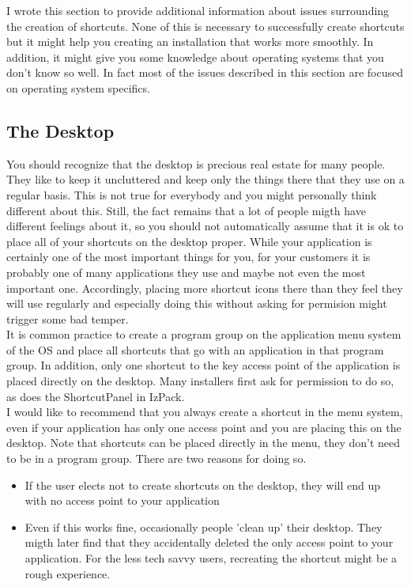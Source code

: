 I wrote this section to provide additional information about
issues surrounding the creation of shortcuts. None of this is necessary
to successfully create shortcuts but it might help you creating an
installation that works more smoothly. In addition, it might give you
some knowledge about operating systems that you don't know so well. In
fact most of the issues described in this section are focused on
operating system specifics.\\

\subsection{The Desktop}

You should recognize that the desktop is precious real estate for many
people. They like to keep it uncluttered and keep only the things there
that they use on a regular basis. This is not true for everybody and you
might personally think different about this. Still, the fact remains
that a lot of people migth have different feelings about it, so you
should not automatically assume that it is ok to place all of your
shortcuts on the desktop proper. While your application is certainly one
of the most important things for you, for your customers it is probably
one of many applications they use and maybe not even the most important one.
Accordingly, placing more shortcut icons there than they feel they will
use regularly and especially doing this without asking for permision
might trigger some bad temper.\\

It is common practice to create a program group on the application menu
system of the OS and place all shortcuts that go with an application in
that program group. In addition, only one shortcut to the key access
point of the application is placed directly on the desktop. Many
installers first ask for permission to do so, as does the ShortcutPanel
in IzPack.\\

I would like to recommend that you always create a shortcut in the menu
system, even if your application has only one access point and you are
placing this on the desktop. Note that shortcuts can be placed directly
in the menu, they don't need to be in a program group. There are two
reasons for doing so.\\

\begin{itemize}
\item If the user elects not to create shortcuts on the desktop, they
      will end up with no access point to your application
\item Even if this works fine, occasionally people 'clean up' their
      desktop. They migth later find that they accidentally deleted the
      only access point to your application. For the less tech savvy
      users, recreating the shortcut might be a rough experience.
\end{itemize}\


